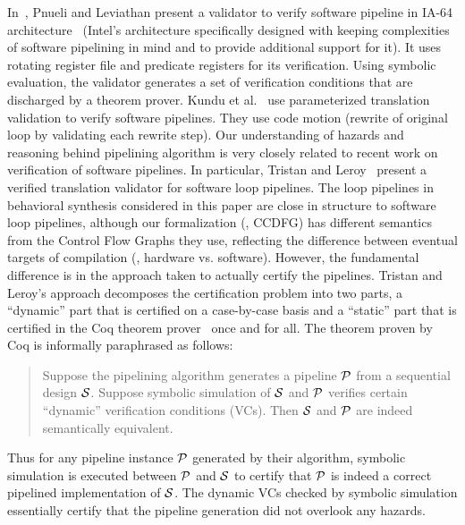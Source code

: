 In~\cite{Leviathan:2002}, Pnueli and Leviathan present a validator to verify software 
pipeline in IA-64 architecture~\cite{Doshi:1999} (Intel's 
architecture specifically designed with keeping complexities of software pipelining in mind and to provide additional 
support for it). It uses rotating register file and predicate registers for its verification. 
Using symbolic evaluation, the validator generates a set of verification conditions 
that are discharged by a theorem prover. Kundu et al.~\cite{Kundu:2009} 
use parameterized translation validation to verify software pipelines. They use 
code motion (rewrite of original loop by validating each rewrite step).
Our understanding of hazards and reasoning behind pipelining algorithm 
is very closely related to recent work on
verification of software pipelines.  In particular, Tristan
and Leroy~\cite{tl:software-popl10} present a verified
translation validator for software loop pipelines.  The loop
pipelines in behavioral synthesis considered in this paper
are close in structure to software loop pipelines, although
our formalization (\eg, CCDFG) has different semantics from
the Control Flow Graphs they use, reflecting the difference
between eventual targets of compilation (\viz, hardware
vs. software).  However, the fundamental difference is in
the approach taken to actually certify the pipelines.
Tristan and Leroy's approach decomposes the certification
problem into two parts, a ``dynamic'' part that is certified
on a case-by-case basis  and a ``static'' part that is
certified in the Coq theorem prover~\cite{coq} once and for all.  The
theorem proven by Coq is informally paraphrased as follows:

\begin{quote}
Suppose the pipelining algorithm generates a pipeline
${\cal{P}}$ from a sequential design ${\cal{S}}$.  Suppose
symbolic simulation of ${\cal{S}}$ and ${\cal{P}}$ verifies
certain ``dynamic'' verification conditions (VCs).  Then
${\cal{S}}$ and ${\cal{P}}$ are indeed semantically
equivalent.
\end{quote}

\noindent
Thus for any pipeline instance ${\cal{P}}$ generated by
their algorithm, symbolic simulation is executed between
${\cal{P}}$ and ${\cal{S}}$ to certify that ${\cal{P}}$ is
indeed a correct pipelined implementation of ${\cal{S}}$.
The dynamic VCs checked by symbolic simulation essentially
certify that the pipeline generation did not overlook any
hazards.

